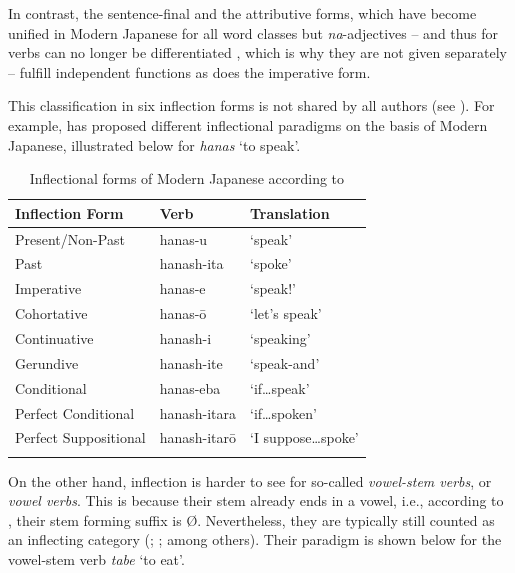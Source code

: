 \documentclass[output=paper,colorlinks,citecolor=brown]{langscibook}
\begin{document}
In contrast, the sentence-final and the attributive forms, which have become unified in Modern Japanese for all word classes but \emph{na}-adjectives -- and thus for verbs can no longer be differentiated \citep{kuno1973, frellesvig2010}, which is why they are not given separately -- fulfill independent functions as does the imperative form.

This classification in six inflection forms is not shared by all authors (see \citealt[229]{shibatani1990}). For example, \citet[27--28]{kuno1973} has proposed different inflectional paradigms on the basis of Modern Japanese, illustrated below for \emph{hanas} `to speak'.

\begin{table}[H]
	\centering
	\begin{tabularx}{0.8\textwidth}{lll}
		\lsptoprule
			Inflection Form & Verb & Translation \\
			\midrule
			Present/Non-Past & hanas-u & `speak’ \\
			Past & hanash-ita & `spoke’ \\
			Imperative & hanas-e & `speak!’ \\
			Cohortative & hanas-ō & `let’s speak’ \\
			Continuative & hanash-i & `speaking’ \\
			Gerundive & hanash-ite & `speak-and’ \\
			Conditional & hanas-eba & `if…speak’ \\
			Perfect Conditional & hanash-itara & `if…spoken’ \\
			Perfect Suppositional & hanash-itarō & `I suppose…spoke’ \is{inflectional class!in Japanese}\is{verb!consonant-stem (in Japanese)}\\
		\lspbottomrule
	\end{tabularx}
	\caption{Inflectional forms of Modern Japanese according to \citet{kuno1973}}
	\label{12tab1}
\end{table}

On the other hand, inflection is harder to see for so-called \emph{vowel-stem verbs}, or \emph{vowel verbs}. This is because their stem already ends in a vowel, i.e., according to \citet[80]{iwasaki2013}, their stem forming suffix is Ø. Nevertheless, they are typically still counted as an inflecting category (\citealt{shibatani1990}; \citealt{uehara1998}; \citealt{iwasaki2013} among others). Their paradigm is shown below for the vowel-stem verb \emph{tabe} `to eat'.
\end{document}
